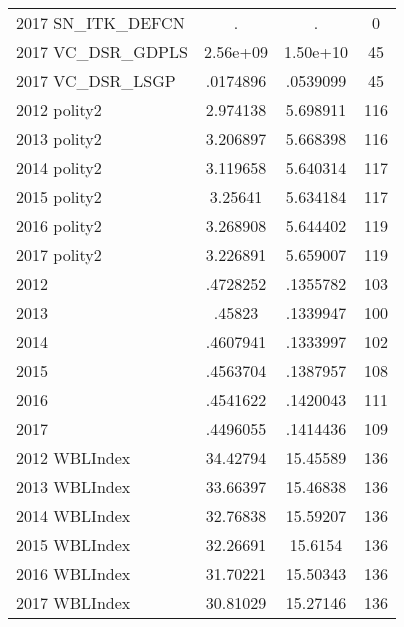 {\begin{tabular}{l*{1}{ccc}}
2017 SN\_ITK\_DEFCN   &           .&           .&           0\\
2017 VC\_DSR\_GDPLS   &    2.56e+09&    1.50e+10&          45\\
2017 VC\_DSR\_LSGP    &    .0174896&    .0539099&          45\\
2012 polity2        &    2.974138&    5.698911&         116\\
2013 polity2        &    3.206897&    5.668398&         116\\
2014 polity2        &    3.119658&    5.640314&         117\\
2015 polity2        &     3.25641&    5.634184&         117\\
2016 polity2        &    3.268908&    5.644402&         119\\
2017 polity2        &    3.226891&    5.659007&         119\\
2012                &    .4728252&    .1355782&         103\\
2013                &      .45823&    .1339947&         100\\
2014                &    .4607941&    .1333997&         102\\
2015                &    .4563704&    .1387957&         108\\
2016                &    .4541622&    .1420043&         111\\
2017                &    .4496055&    .1414436&         109\\
2012 WBLIndex       &    34.42794&    15.45589&         136\\
2013 WBLIndex       &    33.66397&    15.46838&         136\\
2014 WBLIndex       &    32.76838&    15.59207&         136\\
2015 WBLIndex       &    32.26691&     15.6154&         136\\
2016 WBLIndex       &    31.70221&    15.50343&         136\\
2017 WBLIndex       &    30.81029&    15.27146&         136\\
\hline\hline
\end{tabular}
}
